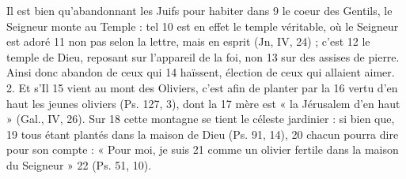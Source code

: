 	Il est bien qu'abandonnant les Juifs pour habiter dans	 
9	 	le coeur des Gentils, le Seigneur monte au Temple : tel	 
10	 	est en effet le temple véritable, où le Seigneur est adoré	 
11	 	non pas selon la lettre, mais en esprit (Jn, IV, 24) ; c'est	 
12	 	le temple de Dieu, reposant sur l'appareil de la foi, non	 
13	 	sur des assises de pierre. Ainsi donc abandon de ceux qui	 
14	 	haïssent, élection de ceux qui allaient aimer. 2. Et s'Il	 
15	 	vient au mont des Oliviers, c'est afin de planter par la	 
16	 	vertu d'en haut les jeunes oliviers (Ps. 127, 3), dont la	 
17	 	mère est « la Jérusalem d'en haut » (Gal., IV, 26). Sur	 
18	 	cette montagne se tient le céleste jardinier : si bien que,	 
19	 	tous étant plantés dans la maison de Dieu (Ps. 91, 14),	 
20	 	chacun pourra dire pour son compte : « Pour moi, je suis	 
21	 	comme un olivier fertile dans la maison du Seigneur »	 
22	 	(Ps. 51, 10).